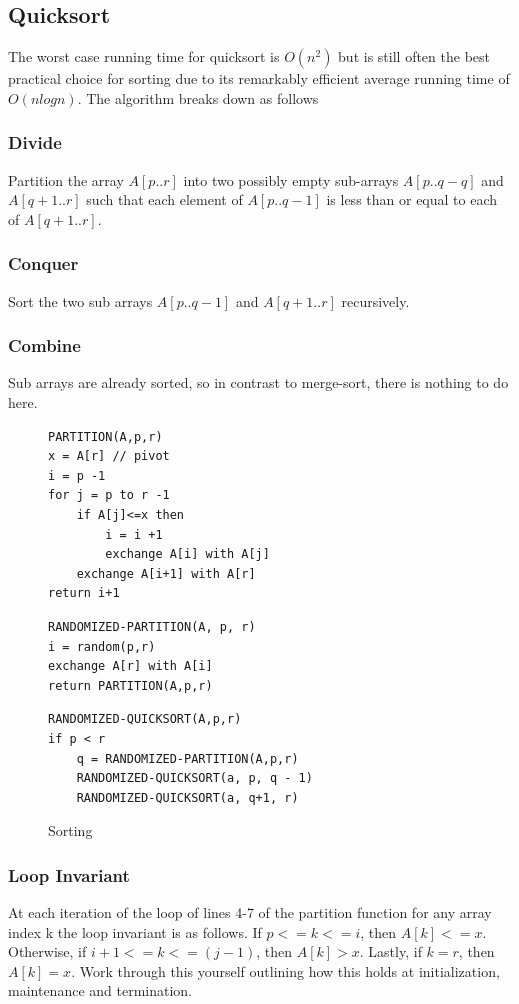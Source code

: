 \documentclass[10pt,a4paper]{article}
\begin{document}
\subsection{Quicksort}
The worst case running time for quicksort is $O(n^2)$ but is still often the best practical choice for sorting due to its remarkably efficient average running time of $O(nlogn)$. The algorithm breaks down as follows
\subsubsection{Divide}
Partition the array $A[p..r]$ into two possibly empty sub-arrays $A[p..q-q]$ and $A[q+1..r]$ such that each element of $A[p..q-1]$ is less than or equal to each of $A[q+1..r]$.
\subsubsection{Conquer}
Sort the two sub arrays $A[p..q-1]$ and $A[q+1..r]$ recursively. 
\subsubsection{Combine}
Sub arrays are already sorted, so in contrast to merge-sort, there is nothing to do here. 

\begin{figure}
\caption{Sorting}
\begin{center}

\begin{lstlisting}
PARTITION(A,p,r)
x = A[r] // pivot
i = p -1 
for j = p to r -1 
	if A[j]<=x then
		i = i +1
		exchange A[i] with A[j]
	exchange A[i+1] with A[r]		
return i+1		
\end{lstlisting}



\begin{lstlisting}
RANDOMIZED-PARTITION(A, p, r)
i = random(p,r)
exchange A[r] with A[i]
return PARTITION(A,p,r)
\end{lstlisting}


\begin{lstlisting}
RANDOMIZED-QUICKSORT(A,p,r)
if p < r 
	q = RANDOMIZED-PARTITION(A,p,r)
	RANDOMIZED-QUICKSORT(a, p, q - 1)
	RANDOMIZED-QUICKSORT(a, q+1, r)
\end{lstlisting}
\label{rndquicksort}
\end{center}
\end{figure}

\subsubsection{Loop Invariant}
At each iteration of the loop of lines 4-7 of the partition function for any array index k the loop invariant is as follows. If $p<=k <= i$, then $A[k] <= x$. Otherwise, if $i+1 <= k <= (j-1)$, then $A[k]>x$. Lastly, if $k = r$, then $A[k] = x$. Work through this yourself outlining how this holds at initialization, maintenance and termination.  
\end{document}
